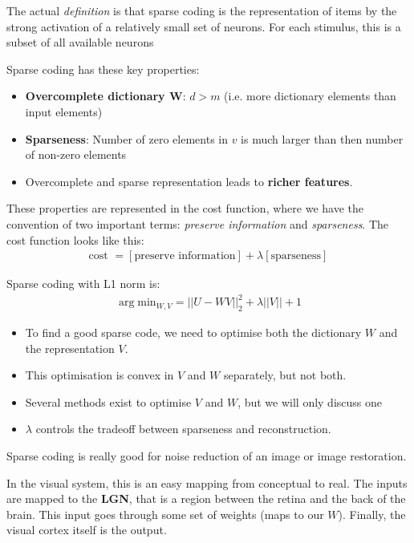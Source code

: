 \documentclass[11pt,a4paper,titlepage,dvipsnames,cmyk]{scrartcl}
\begin{document}
The actual \textit{definition} is that sparse coding is the representation of items by the strong activation of a relatively small set of neurons. For each stimulus, this is a subset of all available neurons

Sparse coding has these key properties:
\begin{itemize}
    \item \textbf{Overcomplete dictionary W}: $d>m$ (i.e. more dictionary elements than input elements)
    \item \textbf{Sparseness}: Number of zero elements in $v$ is much larger than then number of non-zero elements
    \item Overcomplete and sparse representation leads to \textbf{richer features}.
\end{itemize}

These properties are represented in the cost function, where we have the convention of two important terms: \textit{preserve information} and \textit{sparseness}. The cost function looks like this:
\begin{align*}
\text{cost } = [\text{preserve information}] + \lambda [\text{sparseness}]
\end{align*}

Sparse coding with L1 norm is:
\begin{align*}
\arg \text{min}_{W,V} = ||U-WV||^2_2 + \lambda ||V||+1
\end{align*}

\begin{itemize}
    \item To find a good sparse code, we need to optimise both the dictionary $W$ and the representation $V$.
    \item This optimisation is convex in $V$ and $W$ separately, but not both.
    \item Several methods exist to optimise $V$ and $W$, but we will only discuss one
    \item $\lambda$ controls the tradeoff between sparseness and reconstruction.
\end{itemize}

Sparse coding is really good for noise reduction of an image or image restoration.

In the visual system, this is an easy mapping from conceptual to real. The inputs are mapped to the \textbf{LGN}, that is a region between the retina and the back of the brain. This input goes through some set of weights (maps to our $W$). Finally, the visual cortex itself is the output.
\end{document}
